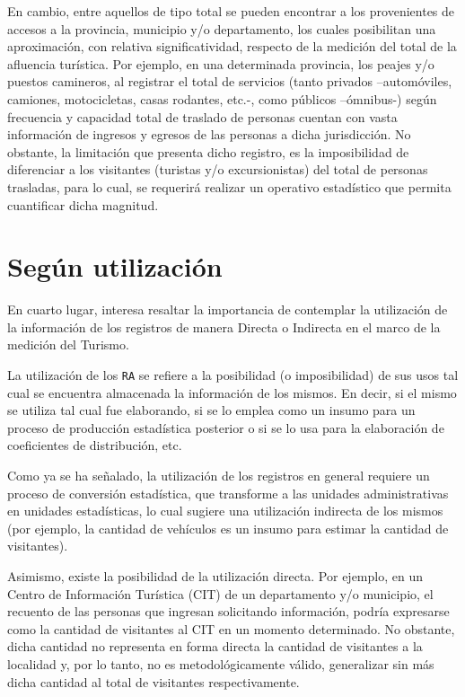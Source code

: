 \documentclass[
]{book}
\begin{document}
En cambio, entre aquellos de tipo total se pueden encontrar a los provenientes de accesos a la provincia, municipio y/o departamento, los cuales posibilitan una aproximación, con relativa significatividad, respecto de la medición del total de la afluencia turística. Por ejemplo, en una determinada provincia, los peajes y/o puestos camineros, al registrar el total de servicios (tanto privados --automóviles, camiones, motocicletas, casas rodantes, etc.-, como públicos --ómnibus-) según frecuencia y capacidad total de traslado de personas cuentan con vasta información de ingresos y egresos de las personas a dicha jurisdicción. No obstante, la limitación que presenta dicho registro, es la imposibilidad de diferenciar a los visitantes (turistas y/o excursionistas) del total de personas trasladas, para lo cual, se requerirá realizar un operativo estadístico que permita cuantificar dicha magnitud.\\

\hypertarget{seguxfan-utilizaciuxf3n}{%
\section{Según utilización}\label{seguxfan-utilizaciuxf3n}}

En cuarto lugar, interesa resaltar la importancia de contemplar la utilización de la información de los registros de manera Directa o Indirecta en el marco de la medición del Turismo.

La utilización de los \texttt{RA} se refiere a la posibilidad (o imposibilidad) de sus usos tal cual se encuentra almacenada la información de los mismos. En decir, si el mismo se utiliza tal cual fue elaborando, si se lo emplea como un insumo para un proceso de producción estadística posterior o si se lo usa para la elaboración de coeficientes de distribución, etc.

Como ya se ha señalado, la utilización de los registros en general requiere un proceso de conversión estadística, que transforme a las unidades administrativas en unidades estadísticas, lo cual sugiere una utilización indirecta de los mismos (por ejemplo, la cantidad de vehículos es un insumo para estimar la cantidad de visitantes).

Asimismo, existe la posibilidad de la utilización directa. Por ejemplo, en un Centro de Información Turística (CIT) de un departamento y/o municipio, el recuento de las personas que ingresan solicitando información, podría expresarse como la cantidad de visitantes al CIT en un momento determinado. No obstante, dicha cantidad no representa en forma directa la cantidad de visitantes a la localidad y, por lo tanto, no es metodológicamente válido, generalizar sin más dicha cantidad al total de visitantes respectivamente.
\end{document}
